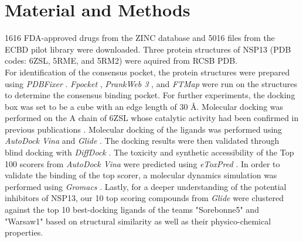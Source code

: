 \documentclass[11pt, letterpaper, titlepage]{article}
\renewcommand{\cite}{\parencite}
\begin{document}
\section{Material and Methods}
1616 FDA-approved drugs from the ZINC database \cite{Irwin.2020} and 5016 files from the ECBD pilot library were downloaded.
Three protein structures of NSP13 (PDB codes: 6ZSL, 5RME, and 5RM2) were aquired from RCSB PDB. \\
\noindent For identification of the consensus pocket, the protein structures were prepared using \textit{PDBFixer} \cite{Eastman_2017}. \textit{Fpocket} \cite{package_Fpocket}, \textit{PrankWeb 3} \cite{package_P2Rank,package_PrankWeb,package_PrankWeb3}, and \textit{FTMap} \cite{package_FTMAP} were run on the structures to determine the consensus binding pocket. For further experiments, the docking box was set to be a cube with an edge length of 30 \AA. Molecular docking was performed on the A chain of 6ZSL whose catalytic activity had been confirmed in previous publications \cite{Berta_2021}. Molecular docking of the ligands was performed using \textit{AutoDock Vina} \cite{Trott.2010} and \textit{Glide} \cite{Friesner2004}. The docking results were then validated through blind docking with \textit{DiffDock} \cite{Corso.2022}. The toxicity and synthetic accessibility of the Top 100 scorers from \textit{AutoDock Vina} were predicted using \textit{eToxPred} \cite{pu2019toxpred}. In order to validate the binding of the top scorer, a molecular dynamics simulation was performed using \textit{Gromacs} \cite{packageGROMACS}. Lastly, for a deeper understanding of the potential inhibitors of \ac{NSP13}, our 10 top scoring compounds from \textit{Glide} were clustered against the top 10 best-docking ligands of the teams "Sorebonne5" and "Warsaw1" based on structural similarity as well as their physico-chemical properties.\\
\end{document}

